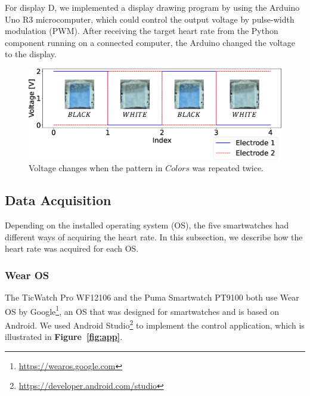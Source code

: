 \documentclass{ieeeaccess}
\newcommand\figref[1]{\textbf{Figure~\ref{fig:#1}}}
\begin{document}
For display D, we implemented a display drawing program by using the Arduino Uno R3 microcomputer, which could control the output voltage by pulse-width modulation (PWM). After receiving the target heart rate from the Python component running on a connected computer, the Arduino changed the voltage to the display.

\begin{figure}[!t]
  \centering
  \includegraphics[width=1\linewidth]{figures/voltage_wave.eps}
  \caption{Voltage changes when the pattern in $Colors$ was repeated twice.}
  \label{fig:colors_flexible}
\end{figure}


\subsection{Data Acquisition}
Depending on the installed operating system (OS), the five smartwatches had different ways of acquiring the heart rate. In this subsection, we describe how the heart rate was acquired for each OS.

\subsubsection{Wear OS}
The TicWatch Pro WF12106 and the Puma Smartwatch PT9100 both use Wear OS by Google\footnote{\url{https://wearos.google.com}}, an OS that was designed for smartwatches and is based on Android. We used Android Studio\footnote{\url{https://developer.android.com/studio}} to implement the control application, which is illustrated in \figref{app}.\par
\end{document}

